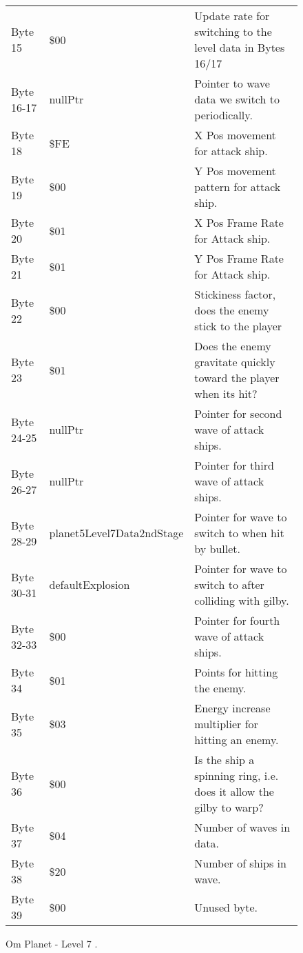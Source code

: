 \begin{figure}[H]
{\begin{adjustbox}{width=12cm}
\begin{tabular}{lll}
 Byte 15    & \$00                       & Update rate for switching to the level data in Bytes 16/17          \\
 Byte 16-17 & nullPtr                   & Pointer to wave data we switch to periodically.                     \\
 Byte 18    & \$FE                       & X Pos movement for attack ship.                                     \\
 Byte 19    & \$00                       & Y Pos movement pattern for attack ship.                             \\
 Byte 20    & \$01                       & X Pos Frame Rate for Attack ship.                                   \\
 Byte 21    & \$01                       & Y Pos Frame Rate for Attack ship.                                   \\
 Byte 22    & \$00                       & Stickiness factor, does the enemy stick to the player               \\
 Byte 23    & \$01                       & Does the enemy gravitate quickly toward the player when its hit?    \\
 Byte 24-25 & nullPtr                   & Pointer for second wave of attack ships.                            \\
 Byte 26-27 & nullPtr                   & Pointer for third wave of attack ships.                             \\
 Byte 28-29 & planet5Level7Data2ndStage & Pointer for wave to switch to when hit by bullet.                   \\
 Byte 30-31 & defaultExplosion          & Pointer for  wave to switch to after colliding with gilby.          \\
 Byte 32-33 & \$00                       & Pointer for fourth wave of attack ships.                            \\
 Byte 34    & \$01                       & Points for hitting the enemy.                                       \\
 Byte 35    & \$03                       & Energy increase multiplier for hitting an enemy.                    \\
 Byte 36    & \$00                       & Is the ship a spinning ring, i.e. does it allow the gilby to warp?  \\
 Byte 37    & \$04                       & Number of waves in data.                                            \\
 Byte 38    & \$20                       & Number of ships in wave.                                            \\
 Byte 39    & \$00                       & Unused byte.                                                        \\
\bottomrule
\end{tabular}

  \end{adjustbox}

  }\caption*{Om Planet - Level 7
.}
\end{figure}

